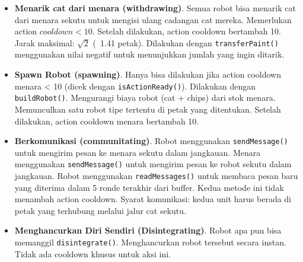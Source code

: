 \begin{itemize}
    \item \textbf{Menarik cat dari menara (withdrawing)}. Semua robot bisa menarik cat dari menara sekutu untuk mengisi ulang cadangan cat mereka. Memerlukan action $cooldown < 10$. Setelah dilakukan, action cooldown bertambah 10. Jarak maksimal: $\sqrt{2}$ (~1.41 petak). Dilakukan dengan \texttt{transferPaint()} menggunakan nilai negatif untuk menunjukkan jumlah yang ingin ditarik.
    \item \textbf{Spawn Robot (spawning)}. Hanya bisa dilakukan jika action cooldown menara < 10 (dicek dengan \texttt{isActionReady()}). Dilakukan dengan \texttt{buildRobot()}. Mengurangi biaya robot (cat + chips) dari stok menara. Memunculkan satu robot tipe tertentu di petak yang ditentukan. Setelah dilakukan, action cooldown menara bertambah 10.
    \item \textbf{Berkomunikasi (communitating)}. Robot menggunakan \texttt{sendMessage()} untuk mengirim pesan ke menara sekutu dalam jangkauan. Menara menggunakan \texttt{sendMessage()} untuk mengirim pesan ke robot sekutu dalam jangkauan. Robot menggunakan \texttt{readMessages()} untuk membaca pesan baru yang diterima dalam 5 ronde terakhir dari buffer. Kedua metode ini tidak menambah action cooldown. Syarat komunikasi: kedua unit harus berada di petak yang terhubung melalui jalur cat sekutu.
    \item \textbf{Menghancurkan Diri Sendiri (Disintegrating)}. Robot apa pun bisa memanggil \texttt{disintegrate()}. Menghancurkan robot tersebut secara instan. Tidak ada cooldown khusus untuk aksi ini.
\end{itemize}